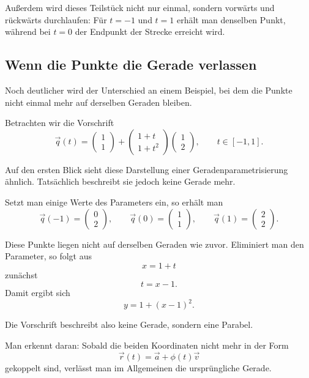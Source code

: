 Außerdem wird dieses Teilstück nicht nur einmal,
sondern vorwärts und rückwärts durchlaufen:
Für \(t=-1\) und \(t=1\) erhält man denselben Punkt,
während bei \(t=0\) der Endpunkt der Strecke erreicht wird.



\subsection{Wenn die Punkte die Gerade verlassen}

Noch deutlicher wird der Unterschied an einem Beispiel,
bei dem die Punkte nicht einmal mehr auf derselben Geraden bleiben.

Betrachten wir die Vorschrift
\[
\vec q(t)=
\begin{pmatrix}
	1\\
	1
\end{pmatrix}
+
\begin{pmatrix}
	1+t\\
	1+t^2
\end{pmatrix}
\begin{pmatrix}
	1\\
	2
\end{pmatrix},
\qquad t\in[-1,1].
\]

Auf den ersten Blick sieht diese Darstellung einer Geradenparametrisierung ähnlich.
Tatsächlich beschreibt sie jedoch keine Gerade mehr.

Setzt man einige Werte des Parameters ein, so erhält man
\[
\vec q(-1)=
\begin{pmatrix}
	0\\
	2
\end{pmatrix},
\qquad
\vec q(0)=
\begin{pmatrix}
	1\\
	1
\end{pmatrix},
\qquad
\vec q(1)=
\begin{pmatrix}
	2\\
	2
\end{pmatrix}.
\]

Diese Punkte liegen nicht auf derselben Geraden wie zuvor.
Eliminiert man den Parameter, so folgt aus
\[
x=1+t
\]
zunächst
\[
t=x-1.
\]
Damit ergibt sich
\[
y=1+(x-1)^2.
\]

Die Vorschrift beschreibt also keine Gerade,
sondern eine Parabel.

Man erkennt daran:
Sobald die beiden Koordinaten nicht mehr in der Form
\[
\vec r(t)=\vec a+\phi(t)\vec v
\]
gekoppelt sind,
verlässt man im Allgemeinen die ursprüngliche Gerade.

